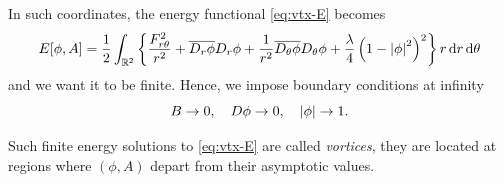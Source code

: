 \documentclass[a4paper,11pt]{article}
\begin{document}
    In such coordinates, the energy functional \eqref{eq:vtx-E} becomes 
    \begin{equation}
        E[\phi,A] = \frac{1}{2} \int_{\mathbb{R}^2} \left\{ \frac{F_{r \theta}^2}{r^2} + \overline{D_r \phi} D_r \phi + \frac{1}{r^2} \overline{D_\theta \phi} D_\theta \phi + \frac{\lambda}{4} \left( 1 - \abs{\phi}^2 \right)^2 \right\} r \dd{r} \dd{\theta}
    \end{equation}
    and we want it to be finite. Hence, we impose boundary conditions at infinity
    \begin{equation}
        B \to 0, \quad D \phi \to 0, \quad \abs{\phi} \to 1.
    \end{equation} 

    Such finite energy solutions to \eqref{eq:vtx-E} are called \emph{vortices}, they are located at regions where $(\phi, A)$ depart from their asymptotic values. 
\end{document}
